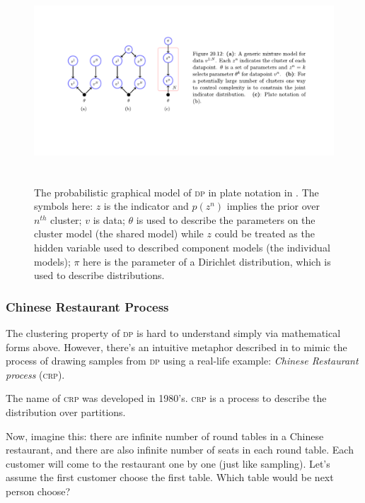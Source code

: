 \documentclass{ar-1col}
\begin{document}
\begin{figure}
    \includegraphics[width=6in, height=3in]{images/Dirichlet.pdf}
    \caption{The probabilistic graphical model of \textsc{dp} in plate notation in \citet{Barber2012}. The symbols here: $z$ is the indicator and $p(z^n)$ implies the prior over $n^{th}$ cluster; $v$ is data; $\theta$ is used to describe the parameters on the cluster model (the shared model) while $z$ could be treated as the hidden variable used to described component models (the individual models); $\pi$ here is the parameter of a Dirichlet distribution, which is used to describe distributions.}
    \label{fig:Dirichlet}
\end{figure}


\subsubsection{Chinese Restaurant Process}

The clustering property of \textsc{dp} is hard to understand simply via mathematical forms above. 
However, there's an intuitive metaphor described in \citet{Teh2006} to mimic the process of drawing samples from \textsc{dp} using a real-life example: \textit{Chinese Restaurant process} (\textsc{crp}).

The name of \textsc{crp} was developed in 1980's. \textsc{crp} is a process to describe the distribution over partitions.

Now, imagine this: there are infinite number of round tables in a Chinese restaurant, and there are also infinite number of seats in each round table. 
Each customer will come to the restaurant one by one (just like sampling). 
Let's assume the first customer choose the first table.
Which table would be next person choose?
\end{document}

